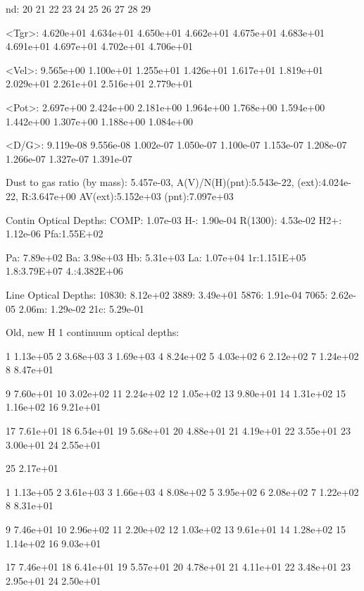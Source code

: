 {    nd:     20           21           22           23           24     
25           26           27           28           29   

 <Tgr>: 4.620e+01    4.634e+01    4.650e+01    4.662e+01    4.675e+01  
4.683e+01    4.691e+01    4.697e+01    4.702e+01    4.706e+01

 <Vel>: 9.565e+00    1.100e+01    1.255e+01    1.426e+01    1.617e+01  
1.819e+01    2.029e+01    2.261e+01    2.516e+01    2.779e+01

 <Pot>: 2.697e+00    2.424e+00    2.181e+00    1.964e+00    1.768e+00  
1.594e+00    1.442e+00    1.307e+00    1.188e+00    1.084e+00

 <D/G>: 9.119e-08    9.556e-08    1.002e-07    1.050e-07    1.100e-07  
1.153e-07    1.208e-07    1.266e-07    1.327e-07    1.391e-07

 Dust to gas ratio (by mass): 5.457e-03, A(V)/N(H)(pnt):5.543e-22,
(ext):4.024e-22, R:3.647e+00 AV(ext):5.152e+03 (pnt):7.097e+03


 Contin Optical Depths: COMP: 1.07e-03     H-: 1.90e-04     R(1300): 4.53e-02
H2+: 1.12e-06  Pfa:1.55E+02

                        Pa: 7.89e+02    Ba: 3.98e+03      Hb: 5.31e+03 
La: 1.07e+04     1r:1.151E+05  1.8:3.79E+07 4.:4.382E+06

  Line Optical Depths: 10830:  8.12e+02  3889: 3.49e+01    5876: 1.91e-04
7065: 2.62e-05  2.06m: 1.29e-02  21c: 5.29e-01


Old, new H  1 continuum optical depths:

     1 1.13e+05     2 3.68e+03     3 1.69e+03     4 8.24e+02     5 4.03e+02
6 2.12e+02     7 1.24e+02     8 8.47e+01

     9 7.60e+01    10 3.02e+02    11 2.24e+02    12 1.05e+02    13 9.80e+01
14 1.31e+02    15 1.16e+02    16 9.21e+01

    17 7.61e+01    18 6.54e+01    19 5.68e+01    20 4.88e+01    21 4.19e+01
22 3.55e+01    23 3.00e+01    24 2.55e+01

    25 2.17e+01

     1 1.13e+05     2 3.61e+03     3 1.66e+03     4 8.08e+02     5 3.95e+02
6 2.08e+02     7 1.22e+02     8 8.31e+01

     9 7.46e+01    10 2.96e+02    11 2.20e+02    12 1.03e+02    13 9.61e+01
14 1.28e+02    15 1.14e+02    16 9.03e+01

    17 7.46e+01    18 6.41e+01    19 5.57e+01    20 4.78e+01    21 4.11e+01
22 3.48e+01    23 2.95e+01    24 2.50e+01

}

